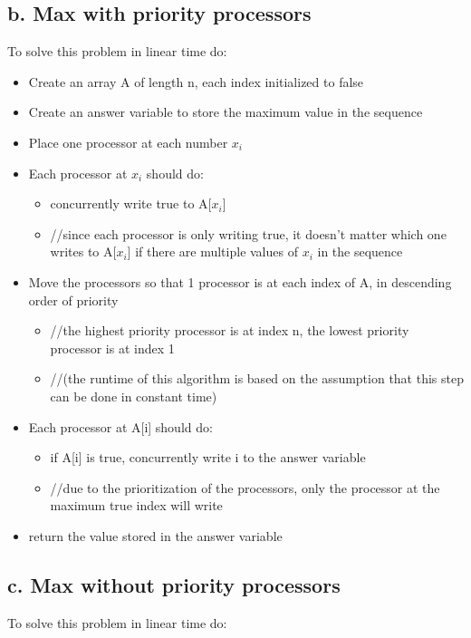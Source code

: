 \documentclass[a4paper]{article}
\begin{document}
\subsection{b. Max with priority processors}
To solve this problem in linear time do:
\begin{itemize}
    \item Create an array A of length n, each index initialized to false
    \item Create an answer variable to store the maximum value in the sequence
    \item Place one processor at each number $x_i$
    \item Each processor at $x_i$ should do:
    \begin{itemize}
        \item concurrently write true to A[$x_i$]
        \item //since each processor is only writing true, it doesn't matter which one writes to A[$x_i$] if there are multiple values of $x_i$ in the sequence
    \end{itemize}
    \item Move the processors so that 1 processor is at each index of A, in descending order of priority
    \begin{itemize}
        \item //the highest priority processor is at index n, the lowest priority processor is at index 1
        \item //(the runtime of this algorithm is based on the assumption that this step can be done in constant time)
    \end{itemize}
    \item Each processor at A[i] should do:
    \begin{itemize}
        \item if A[i] is true, concurrently write i to the answer variable
        \item //due to the prioritization of the processors, only the processor at the maximum true index will write
    \end{itemize}
    \item return the value stored in the answer variable
    
\end{itemize}


\subsection{c. Max without priority processors}
To solve this problem in linear time do:
\end{document}

